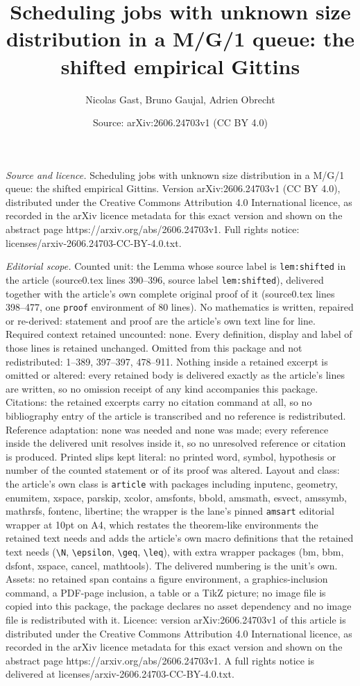\documentclass[10pt,a4paper]{amsart}
\title[Scheduling jobs with unknown size distribution in a M/G/1 qu]{Scheduling jobs with unknown size distribution in a M/G/1 queue: the shifted empirical Gittins}
\author{Nicolas Gast, Bruno Gaujal, Adrien Obrecht}
\date{Source: arXiv:2606.24703v1 (CC BY 4.0)}
\begin{document}
\maketitle

\noindent\emph{Source and licence.} Scheduling jobs with unknown size distribution in a M/G/1 queue: the shifted empirical Gittins. Version arXiv:2606.24703v1 (CC BY 4.0), distributed under the Creative Commons Attribution 4.0 International licence, as recorded in the arXiv licence metadata for this exact version and shown on the abstract page https://arxiv.org/abs/2606.24703v1. Full rights notice: licenses/arxiv-2606.24703-CC-BY-4.0.txt.\par\smallskip

\noindent\textit{Editorial scope.} Counted unit: the Lemma whose source label is \texttt{lem:shifted} in the article (source0.tex lines 390--396, source label \texttt{lem:shifted}), delivered together with the article's own complete original proof of it (source0.tex lines 398--477, one \texttt{proof} environment of 80 lines). No mathematics is written, repaired or re-derived: statement and proof are the article's own text line for line. Required context retained uncounted: none. Every definition, display and label of those lines is retained unchanged. Omitted from this package and not redistributed: 1--389, 397--397, 478--911. Nothing inside a retained excerpt is omitted or altered: every retained body is delivered exactly as the article's lines are written, so no omission receipt of any kind accompanies this package. Citations: the retained excerpts carry no citation command at all, so no bibliography entry of the article is transcribed and no reference is redistributed. Reference adaptation: none was needed and none was made; every reference inside the delivered unit resolves inside it, so no unresolved reference or citation is produced. Printed slips kept literal: no printed word, symbol, hypothesis or number of the counted statement or of its proof was altered. Layout and class: the article's own class is \texttt{article} with packages including inputenc, geometry, enumitem, xspace, parskip, xcolor, amsfonts, bbold, amsmath, esvect, amssymb, mathrsfs, fontenc, libertine; the wrapper is the lane's pinned \texttt{amsart} editorial wrapper at 10pt on A4, which restates the theorem-like environments the retained text needs and adds the article's own macro definitions that the retained text needs (\texttt{\textbackslash N}, \texttt{\textbackslash epsilon}, \texttt{\textbackslash geq}, \texttt{\textbackslash leq}), with extra wrapper packages (bm, bbm, dsfont, xspace, cancel, mathtools). The delivered numbering is the unit's own. Assets: no retained span contains a figure environment, a graphics-inclusion command, a PDF-page inclusion, a table or a TikZ picture; no image file is copied into this package, the package declares no asset dependency and no image file is redistributed with it. Licence: version arXiv:2606.24703v1 of this article is distributed under the Creative Commons Attribution 4.0 International licence, as recorded in the arXiv licence metadata for this exact version and shown on the abstract page https://arxiv.org/abs/2606.24703v1. A full rights notice is delivered at licenses/arxiv-2606.24703-CC-BY-4.0.txt. 
\end{document}
